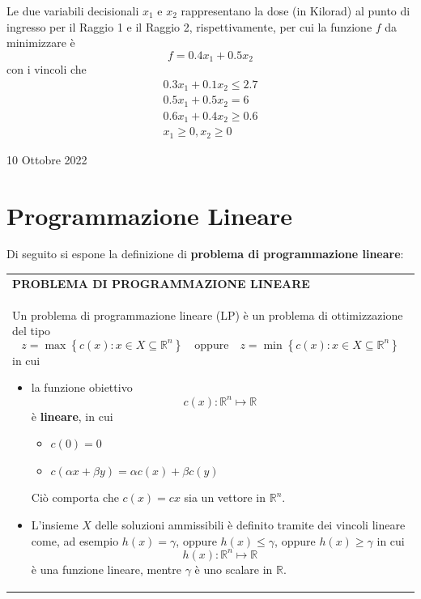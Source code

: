 \documentclass[a4paper]{extarticle}
\renewcommand\arraystretch{}
\begin{document}
\vspace{1em}
\noindent
Le due variabili decisionali $x_1$ e $x_2$ rappresentano la dose (in Kilorad) al punto di ingresso per il Raggio 1 e il Raggio 2, rispettivamente, per cui la funzione $f$ da minimizzare è
\[f = 0.4x_1 + 0.5x_2\]
con i vincoli che
\begin{align*}
    0.3x_1 + 0.1x_2 \leq 2.7\\
    0.5x_1 + 0.5x_2 = 6\\
    0.6x_1+0.4x_2 \geq 0.6\\
    x_1 \geq 0, x_2 \geq 0
\end{align*}

\newpage
\begin{center}
    10 Ottobre 2022
\end{center}
\section{Programmazione Lineare}
Di seguito si espone la definizione di \textbf{problema di programmazione lineare}: 

\vspace{1em}
\setlength{\tabcolsep}{14pt}
\renewcommand{\arraystretch}{2}
\noindent
\begin{tabularx}{\textwidth}{@{}|P|@{}}
    \hline
    {\textbf{PROBLEMA DI PROGRAMMAZIONE LINEARE}}\\
    \parbox{\linewidth}{Un problema di programmazione lineare (LP) è un problema di ottimizzazione del tipo
    \[z = \max \left\{c(x) : x \in X \subseteq \mathbb{R}^n \right\} \hspace{1em} \text{oppure} \hspace{1em} z = \min \left\{c(x) : x \in X \subseteq \mathbb{R}^n \right\}\]
    in cui
    \begin{itemize}
        \item la funzione obiettivo
        \[c(x) : \mathbb{R}^n \longmapsto \mathbb{R}\]
        è \textbf{lineare}, in cui
        \begin{itemize}
            \item $c(0)=0$
            \item $c(\alpha x + \beta y) = \alpha c(x) + \beta c(y)$
        \end{itemize}
        Ciò comporta che $c(x) = c x$ sia un vettore in $\mathbb{R}^n$.

        \item L'insieme $X$ delle soluzioni ammissibili è definito tramite dei vincoli lineare come, ad esempio $h(x) = \gamma$, oppure $h(x) \leq \gamma$, oppure $h(x) \geq \gamma$ in cui
        \[h(x) : \mathbb{R}^n \longmapsto \mathbb{R}\]
        è una funzione lineare, mentre $\gamma$ è uno scalare in $\mathbb{R}$.
    \end{itemize}
    \vspace{1mm}}\\
    \hline
\end{tabularx}
\end{document}
